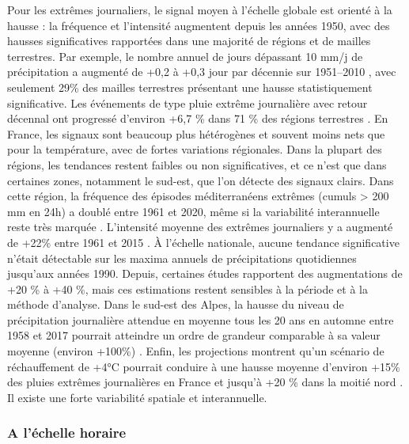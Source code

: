 \documentclass[
  article,
  nofooter,
  noheadings]{jss}
\begin{document}
Pour les extrêmes journaliers, le signal moyen à l'échelle globale est
orienté à la hausse : la fréquence et l'intensité augmentent depuis les
années 1950, avec des hausses significatives rapportées dans une
majorité de régions et de mailles terrestres. Par exemple, le nombre
annuel de jours dépassant 10 mm/j de précipitation a augmenté de +0,2 à
+0,3 jour par décennie sur 1951--2010 \citep{Donat2013}, avec seulement
29\% des mailles terrestres présentant une hausse statistiquement
significative. Les événements de type pluie extrême journalière avec
retour décennal ont progressé d'environ +6,7 \% dans 71 \% des régions
terrestres \citep{IPCC2021}. En France, les signaux sont beaucoup plus
hétérogènes et souvent moins nets que pour la température, avec de
fortes variations régionales. Dans la plupart des régions, les tendances
restent faibles ou non significatives, et ce n'est que dans certaines
zones, notamment le sud-est, que l'on détecte des signaux clairs. Dans
cette région, la fréquence des épisodes méditerranéens extrêmes (cumuls
\textgreater{} 200 mm en 24h) a doublé entre 1961 et 2020, même si la
variabilité interannuelle reste très marquée
\citep{meteofrance2024_episodesMediterraneens}. L'intensité moyenne des
extrêmes journaliers y a augmenté de +22\% entre 1961 et 2015
\citep{Ribes2019}. À l'échelle nationale, aucune tendance significative
n'était détectable sur les maxima annuels de précipitations quotidiennes
jusqu'aux années 1990. Depuis, certaines études rapportent des
augmentations de +20 \% à +40 \%, mais ces estimations restent sensibles
à la période et à la méthode d'analyse. Dans le sud-est des Alpes, la
hausse du niveau de précipitation journalière attendue en moyenne tous
les 20 ans en automne entre 1958 et 2017 pourrait atteindre un ordre de
grandeur comparable à sa valeur moyenne (environ +100\%)
\citep{blanchet2021explaining}. Enfin, les projections montrent qu'un
scénario de réchauffement de +4°C pourrait conduire à une hausse moyenne
d'environ +15\% des pluies extrêmes journalières en France et jusqu'à
+20 \% dans la moitié nord \citep{soubeyroux:hal-04991790}. Il existe
une forte variabilité spatiale et interannuelle.

\subsubsection{A l'échelle horaire}\label{a-luxe9chelle-horaire}
\end{document}
